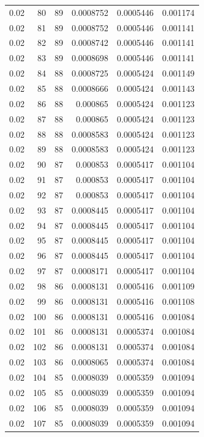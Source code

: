 \begin{tabular}{rrrrrr}
0.02 & 80 & 89 & 0.0008752 & 0.0005446 & 0.001174 \\
0.02 & 81 & 89 & 0.0008752 & 0.0005446 & 0.001141 \\
0.02 & 82 & 89 & 0.0008742 & 0.0005446 & 0.001141 \\
0.02 & 83 & 89 & 0.0008698 & 0.0005446 & 0.001141 \\
0.02 & 84 & 88 & 0.0008725 & 0.0005424 & 0.001149 \\
0.02 & 85 & 88 & 0.0008666 & 0.0005424 & 0.001143 \\
0.02 & 86 & 88 & 0.000865 & 0.0005424 & 0.001123 \\
0.02 & 87 & 88 & 0.000865 & 0.0005424 & 0.001123 \\
0.02 & 88 & 88 & 0.0008583 & 0.0005424 & 0.001123 \\
0.02 & 89 & 88 & 0.0008583 & 0.0005424 & 0.001123 \\
0.02 & 90 & 87 & 0.000853 & 0.0005417 & 0.001104 \\
0.02 & 91 & 87 & 0.000853 & 0.0005417 & 0.001104 \\
0.02 & 92 & 87 & 0.000853 & 0.0005417 & 0.001104 \\
0.02 & 93 & 87 & 0.0008445 & 0.0005417 & 0.001104 \\
0.02 & 94 & 87 & 0.0008445 & 0.0005417 & 0.001104 \\
0.02 & 95 & 87 & 0.0008445 & 0.0005417 & 0.001104 \\
0.02 & 96 & 87 & 0.0008445 & 0.0005417 & 0.001104 \\
0.02 & 97 & 87 & 0.0008171 & 0.0005417 & 0.001104 \\
0.02 & 98 & 86 & 0.0008131 & 0.0005416 & 0.001109 \\
0.02 & 99 & 86 & 0.0008131 & 0.0005416 & 0.001108 \\
0.02 & 100 & 86 & 0.0008131 & 0.0005416 & 0.001084 \\
0.02 & 101 & 86 & 0.0008131 & 0.0005374 & 0.001084 \\
0.02 & 102 & 86 & 0.0008131 & 0.0005374 & 0.001084 \\
0.02 & 103 & 86 & 0.0008065 & 0.0005374 & 0.001084 \\
0.02 & 104 & 85 & 0.0008039 & 0.0005359 & 0.001094 \\
0.02 & 105 & 85 & 0.0008039 & 0.0005359 & 0.001094 \\
0.02 & 106 & 85 & 0.0008039 & 0.0005359 & 0.001094 \\
0.02 & 107 & 85 & 0.0008039 & 0.0005359 & 0.001094 \\

\end{tabular}
